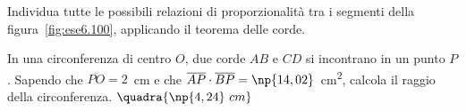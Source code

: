 \noindent\begin{minipage}{.4\textwidth}
\begin{esercizio}
\label{ese:6.100}
Individua tutte le possibili relazioni di proporzionalità tra i 
segmenti della figura~\ref{fig:ese6.100}, applicando il teorema delle 
corde.
\end{esercizio}
\end{minipage}
\begin{minipage}{.6\textwidth}
\begin{inaccessibleblock}
 \begin{center}  \end{center}
\end{inaccessibleblock}
\end{minipage}


% 

\begin{esercizio}
\label{ese:6.104}
In una circonferenza di centro \(O\), due corde \(AB\) e \(CD\) si 
incontrano in un punto \(P\). Sapendo che \(\overline{PO}=2\)~cm e che 
\(\overline{AP}\cdot \overline{BP}=\np{14,02}\)~cm\textsuperscript{2}, 
calcola il raggio della circonferenza.
\hfill\(\quadra{\np{4,24}~cm}\)
\end{esercizio}

